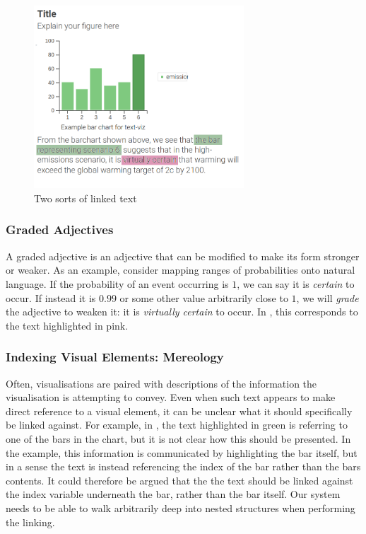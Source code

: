 \begin{figure}
   \includegraphics[width=0.7\textwidth]{fig/text-viz-types.png}
   \caption{Two sorts of linked text}
   \label{fig:linked-text-types}
\end{figure}

\subsubsection{Graded Adjectives}
A graded adjective is an adjective that can be modified to make its form stronger or weaker.
As an example, consider mapping ranges of probabilities onto natural language. If the probability
of an event occurring is $1$, we can say it is \emph{certain} to occur. If instead it is $0.99$
or some other value arbitrarily close to $1$, we will \emph{grade} the adjective to weaken it:
it is \emph{virtually certain} to occur. In , this corresponds to the text
highlighted in pink.

\subsubsection{Indexing Visual Elements: Mereology}
Often, visualisations are paired with descriptions of the information the visualisation is attempting to
convey. Even when such text appears to make direct reference to a visual element, it can be unclear what 
it should specifically be linked against. For example, in , the text highlighted
in green is referring to one of the bars in the chart, but it is not clear how this should be presented.
In the example, this information is communicated by highlighting the bar itself, but in a sense the text is
instead referencing the index of the bar rather than the bars contents. It could therefore be argued that the
the text should be linked against the index variable underneath the bar, rather than the bar itself.
Our system needs to be able to walk arbitrarily deep into nested structures when performing the linking.

